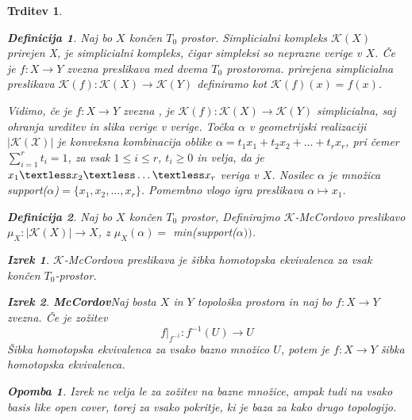 \documentclass[a4paper,12pt]{article}
\theoremstyle{definition}
\newtheorem{definicija}{Definicija}
\theoremstyle{plain}
\newtheorem{izrek}{Izrek}
\theoremstyle{definition}
\theoremstyle{plain}
\newtheorem{trditev}{Trditev}
\theoremstyle{plain}
\theoremstyle{plain}
\newtheorem{opomba}{Opomba}
\theoremstyle{plain}
\begin{document}
\begin{trditev}
\begin{definicija}
    Naj bo $X$ končen $T_0$ prostor. \textit{Simplicialni kompleks} $\mathcal{K}(X)$ \textit{prirejen X}, je simplicialni kompleks, čigar simpleksi so neprazne verige v $X$. Če je $f: X\rightarrow Y$ zvezna preslikava med dvema $T_0$ prostoroma. \textit{prirejena simplicialna preslikava} $\mathcal{K}(f):\mathcal{K}(X) \rightarrow \mathcal{K}(Y)$ definiramo kot $\mathcal{K}(f)(x) = f(x)$.
\end{definicija}
Vidimo, če je $f: X\rightarrow Y$ zvezna , je $\mathcal{K}(f):\mathcal{K}(X) \rightarrow \mathcal{K}(Y)$ simplicialna, saj ohranja ureditev in slika verige v verige.
Točka $\alpha$ v geometrijski realizaciji $|\mathcal{K(X)}|$ je
konveksna kombinacija oblike
$\alpha = t_1x_1+t_2x_2 + \ldots + t_r x_r$, pri čemer 
$\sum_{i=1}^{r}t_i=1$, za vsak $1 \le i \le r$, $t_i \ge 0$ in 
velja, da je $x_1 \textless x_2 \textless \ldots \textless x_r$ veriga v $X$.
Nosilec $\alpha$ je množica \textit{support}($\alpha$)$= \{x_1,x_2,\ldots,x_r\}$. Pomembno vlogo igra 
 preslikava $\alpha \mapsto x_1$.
 
 \begin{definicija}
    Naj bo $X$ končen $T_0$ prostor, Definirajmo
    $\mathcal{K}$-\textit{McCordovo} preslikavo $\mu_X:|\mathcal{K}
    (X)|\rightarrow X$, z $\mu_X(\alpha) =$
    min(\textit{support}($\alpha))$.
\end{definicija}

\begin{izrek}
    $\mathcal{K}$-\textit{McCordova} preslikava je šibka homotopska 
    ekvivalenca za vsak končen $T_0$-prostor.
\end{izrek}


\begin{izrek}{\textbf{McCordov}}\label{iz:mccord}
    Naj bosta $X$ in $Y$ topološka prostora in naj bo $f:X\rightarrow Y$ zvezna. Če je zožitev
    $$
    f|_{f^{-1}}:f^{-1}(U)\rightarrow U
    $$
    Šibka homotopska ekvivalenca za vsako bazno množico $U$, potem je $f:X\rightarrow Y$  šibka homotopska ekvivalenca.
\end{izrek}

\begin{opomba}
    Izrek ne velja le za zožitev na bazne množice, ampak tudi na vsako \textit{basis like open cover}, torej za vsako pokritje, ki je baza za kako drugo topologijo.
\end{opomba}




\end{trditev}
\end{document}
